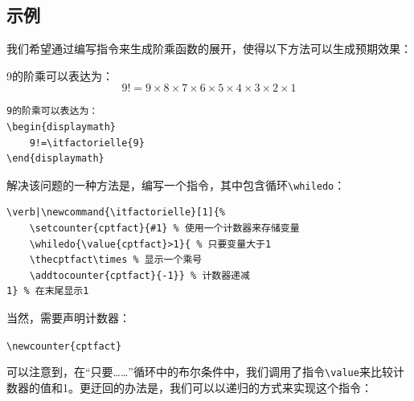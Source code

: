 \subsection{示例}

我们希望通过编写指令来生成阶乘函数的展开，使得以下方法可以生成预期效果：

\begin{codelist}[9.9]{
    9的阶乘可以表达为：
    \begin{displaymath}
        9!=9\times 8\times 7\times 6\times 5\times 4\times 3\times 2\times 1
    \end{displaymath}
}
\begin{verbatim}
9的阶乘可以表达为：
\begin{displaymath}
    9!=\itfactorielle{9}
\end{displaymath}\end{verbatim}
\end{codelist}

解决该问题的一种方法是，编写一个指令，其中包含循环\verb|\whiledo|：

\begin{dmd}
    \begin{verbatim}
\verb|\newcommand{\itfactorielle}[1]{%
    \setcounter{cptfact}{#1} % 使用一个计数器来存储变量
    \whiledo{\value{cptfact}>1}{ % 只要变量大于1
    \thecptfact\times % 显示一个乘号
    \addtocounter{cptfact}{-1}} % 计数器递减
1} % 在末尾显示1
    \end{verbatim}
\end{dmd}

当然，需要声明计数器：

\begin{dmd}
\verb+\newcounter{cptfact}+
\end{dmd}

可以注意到，在“只要……”循环中的布尔条件中，我们调用了指令\verb|\value|来比较计数器的值和1。更迂回的办法是，我们可以以递归的方式来实现这个指令：


